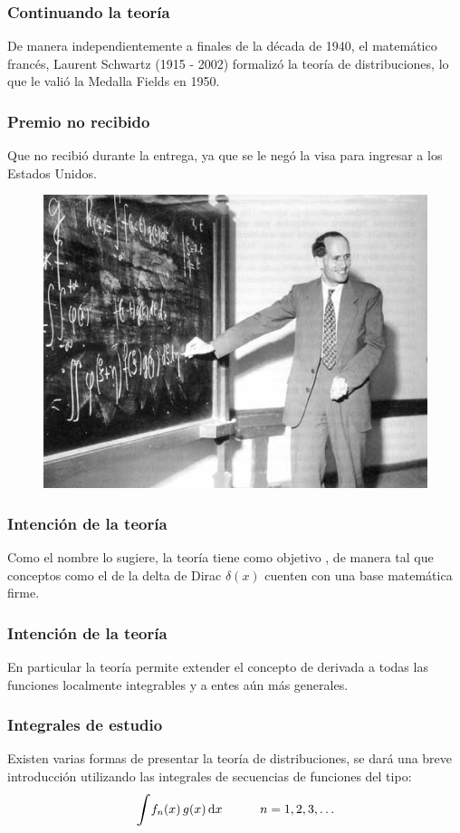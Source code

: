 \documentclass[12pt]{beamer}
\begin{document}
\begin{frame}
\frametitle{Continuando la teoría}
De manera independientemente a finales de la década de 1940, el matemático francés, Laurent Schwartz (1915 - 2002) formalizó la teoría de distribuciones, \pause lo que le valió la Medalla Fields en 1950.
\end{frame}
\begin{frame}
\frametitle{Premio no recibido}
Que no recibió durante la entrega, ya que se le negó la visa para ingresar a los Estados Unidos.
\begin{figure}
    \centering
    \includegraphics[scale=0.35]{Imagenes/Laurent_Schwartz.jpg}
\end{figure}
\end{frame}

\begin{frame}
\frametitle{Intención de la teoría}
Como el nombre lo sugiere, la teoría tiene como objetivo  , \pause de manera tal que conceptos como el de la delta de Dirac $\delta (x)$ cuenten con una base matemática firme.
\end{frame}

\begin{frame}
\frametitle{Intención de la teoría}
En particular la teoría permite extender el concepto de derivada a todas las funciones localmente integrables y a entes aún más generales.
\end{frame}

\begin{frame}
\frametitle{Integrales de estudio}
Existen varias formas de presentar la teoría de distribuciones, se dará una breve introducción utilizando las integrales de secuencias de funciones del tipo:
\pause
\begin{equation}
\scaleint{6ex} f_{n} (x) \, g (x) \dd{x} \hspace{1cm} n = 1, 2, 3 , \ldots
\label{eq:ecuacion_1_99}
\end{equation}
\end{frame}
\end{document}
